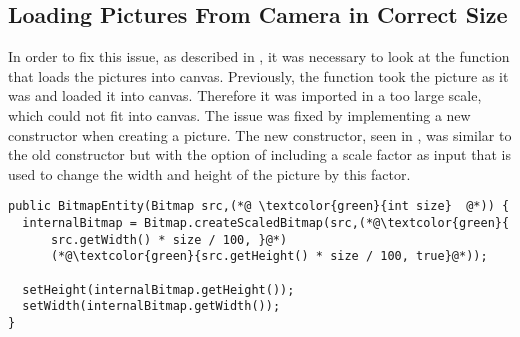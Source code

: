 \subsection{Loading Pictures From Camera in Correct Size}
In order to fix this issue, as described in \secref{}, it was necessary to look at the function that loads the pictures into canvas.
Previously, the function took the picture as it was and loaded it into canvas.
Therefore it was imported in a too large scale, which could not fit into canvas.
The issue was fixed by implementing a new constructor when creating a picture.
The new constructor, seen in , was similar to the old constructor but with the option of including a scale factor as input that is used to change the width and height of the picture by this factor.


\begin{lstlisting}[caption={New Constructor for \textit{BitmapEntity}}, label=lst:BitmapEnity-Constructor-New, float=h]
public BitmapEntity(Bitmap src,(*@ \textcolor{green}{int size}  @*)) {
  internalBitmap = Bitmap.createScaledBitmap(src,(*@\textcolor{green}{
      src.getWidth() * size / 100, }@*)
      (*@\textcolor{green}{src.getHeight() * size / 100, true}@*));
  
  setHeight(internalBitmap.getHeight());
  setWidth(internalBitmap.getWidth());
}
\end{lstlisting}
